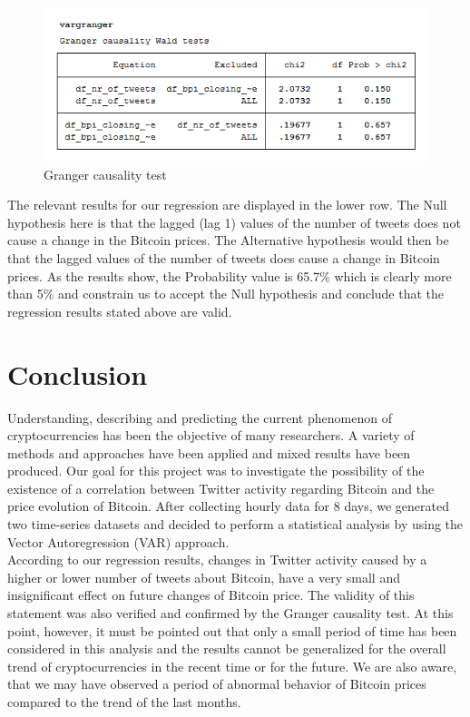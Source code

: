 \documentclass[a4paper,american,12pt]{article}
\begin{document}
\begin{spacing}{1.2}
\begin{figure}[H]
\centering
\includegraphics[scale=0.85]{stata_export_graphs/granger_test.png}
\caption{Granger causality test}
\label{fig:6}
\end{figure}

The relevant results for our regression are displayed in the lower row. The Null hypothesis here is that the lagged (lag 1) values of the number of tweets does not cause a change in the Bitcoin prices. The Alternative hypothesis would then be that the lagged values of the number of tweets does cause a change in Bitcoin prices. As the results show, the Probability value is 65.7\% which is clearly more than 5\% and constrain us to accept the Null hypothesis and conclude that the regression results stated above are valid.\\

\clearpage

\section{Conclusion}
\label{sec:Conclustion}
Understanding, describing and predicting the current phenomenon of cryptocurrencies has been the objective of many researchers. A variety of methods and approaches have been applied and mixed results have been produced. Our goal for this project was to investigate the possibility of the existence of a correlation between Twitter activity regarding Bitcoin and the price evolution of Bitcoin. After collecting hourly data for 8 days, we generated two time-series datasets and decided to perform a statistical analysis by using the Vector Autoregression (VAR) approach.\\

According to our regression results, changes in Twitter activity caused by a higher or lower number of tweets about Bitcoin, have a very small and insignificant effect on future changes of Bitcoin price. The validity of this statement was also verified and confirmed by the Granger causality test. At this point, however, it must be pointed out that only a small period of time has been considered in this analysis and the results cannot be generalized for the overall trend of cryptocurrencies in the recent time or for the future. We are also aware, that we may have observed a period of abnormal behavior of Bitcoin prices compared to the trend of the last months.\\


\end{spacing}
\end{document}
